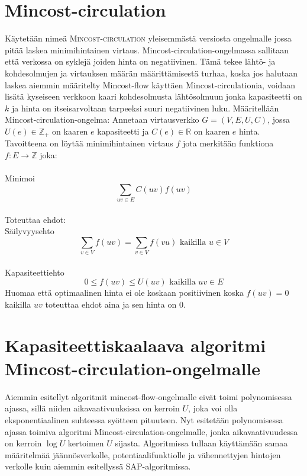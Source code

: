 \documentclass[a4paper, 11pt]{article}
\begin{document}
\section*{Mincost-circulation}
Käytetään nimeä \textsc{Mincost-circulation} yleisemmästä versiosta ongelmalle jossa pitää
laskea minimihintainen virtaus. Mincost-circulation-ongelmassa sallitaan että
verkossa on syklejä joiden hinta on negatiivinen. Tämä tekee lähtö- ja kohdesolmujen
ja virtauksen määrän määrittämisestä turhaa, koska jos halutaan laskea aiemmin määritelty
Mincost-flow käyttäen Mincost-circulationia, voidaan lisätä kyseiseen verkkoon kaari 
kohdesolmusta lähtösolmuun jonka kapasiteetti on $k$ ja hinta on itseisarvoltaan
tarpeeksi suuri negatiivinen luku. Määritellään Mincost-circulation-ongelma: 
Annetaan virtausverkko $G = (V, E, U, C)$, jossa $U(e) \in \mathbb{Z_+}$ on 
kaaren $e$ kapasiteetti ja $C(e) \in \mathbb{R}$ on kaaren $e$ hinta. Tavoitteena on löytää minimihintainen virtaus
$f$ jota merkitään funktiona
$f : E \rightarrow \mathbb{Z}$ joka: \\\\ Minimoi $$\sum_{uv \in E} C(uv) f(uv)$$\\
Toteuttaa ehdot:\\ Säilyvyysehto
$$\sum_{v \in V} f(uv) = \sum_{v \in V} f(vu) \text{ kaikilla } u \in V$$
\\Kapasiteettiehto
$$0 \le f(uv) \le U(uv) \text{ kaikilla } uv \in E$$
Huomaa että optimaalinen hinta ei ole koskaan positiivinen koska $f(uv) = 0$ kaikilla
$uv$ toteuttaa ehdot aina ja sen hinta on $0$.
\section*{Kapasiteettiskaalaava algoritmi Mincost-circulation-ongelmalle}
Aiemmin esitellyt algoritmit mincost-flow-ongelmalle eivät toimi polynomisessa ajassa,
sillä niiden aikavaativuuksissa on kerroin $U$, joka voi olla eksponentiaalinen suhteessa
syötteen pituuteen. Nyt esitetään polynomisessa ajassa toimiva
algoritmi Mincost-circulation-ongelmalle, jonka aikavaativuudessa on 
kerroin $\log U$ kertoimen $U$ sijasta. Algoritmissa
tullaan käyttämään samaa määritelmää jäännösverkolle, potentiaalifunktiolle ja vähennettyjen
hintojen verkolle kuin aiemmin esitellyssä SAP-algoritmissa.
\end{document}
